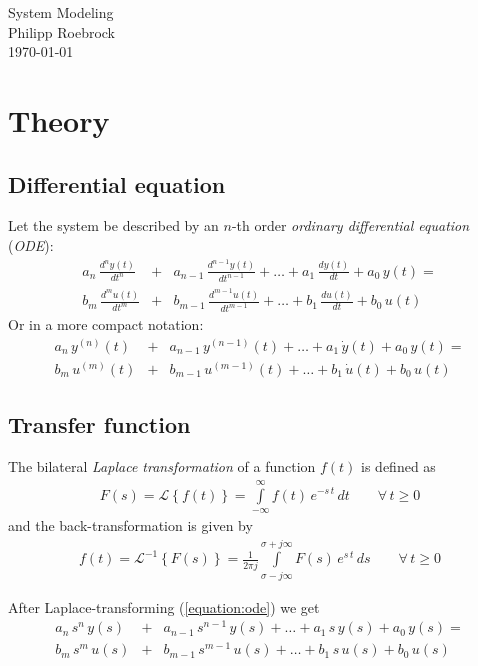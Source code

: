 \documentclass[a4paper,12pt]{article}
\newcommand{\Section}[2]{\section{#2}\label{section:#1}}
\newcommand{\SubSection}[2]{\subsection{#2}\label{subsection:#1}}
\newcommand{\ELabel}[1]{\label{equation:#1}}
\newcommand{\ERef}[1]{(\ref{equation:#1})}
\begin{document}
\vspace{1.5cm}
\begin{center}
{\Huge System Modeling}\\[3ex]
Philipp Roebrock\\[1ex]
\today\\
\end{center}
\vspace{1cm}






\Section{theory}{Theory}


\SubSection{diffeq}{Differential equation}

Let the system be described by an $n$-th order {\em ordinary differential equation} ({\em ODE}):
\begin{eqnarray}
a_{n}\,\frac{d^{n}y(t)}{dt^{n}}&+&a_{n-1}\,\frac{d^{n-1}y(t)}{dt^{n-1}}+\ldots+a_{1}\,\frac{dy(t)}{dt}+a_{0}\,y(t)=\nonumber\\
b_{m}\,\frac{d^{m}u(t)}{dt^{m}}&+&b_{m-1}\,\frac{d^{m-1}u(t)}{dt^{m-1}}+\ldots+b_{1}\,\frac{du(t)}{dt}+b_{0}\,u(t)
\end{eqnarray}
Or in a more compact notation:
\begin{eqnarray}
\ELabel{ode}
a_{n}\,y^{(n)}(t)&+&a_{n-1}\,y^{(n-1)}(t)+\ldots+a_{1}\,\dot{y}(t)+a_{0}\,y(t)=\nonumber\\
b_{m}\,u^{(m)}(t)&+&b_{m-1}\,u^{(m-1)}(t)+\ldots+b_{1}\,\dot{u}(t)+b_{0}\,u(t)
\end{eqnarray}

\SubSection{xferfunc}{Transfer function}

The bilateral {\em Laplace transformation} of a function $f(t)$ is defined as
\begin{eqnarray}
F(s)=\mathcal{L}\left\{f(t)\right\}=\int\limits_{-\infty}^{\infty}f(t)\,e^{-s\,t}\,dt\qquad\forall\,t\geq0
\end{eqnarray}
and the back-transformation is given by
\begin{eqnarray}
f(t)=\mathcal{L}^{-1}\left\{F(s)\right\}=\frac{1}{2\pi j}\int\limits_{\sigma-j\infty}^{\sigma+j\infty}F(s)\,e^{s\,t}\,ds\qquad\forall\,t\geq0
\end{eqnarray}

After Laplace-transforming \ERef{ode} we get
\begin{eqnarray}
\ELabel{xfer}
a_{n}\,s^{n}\,y(s)&+&a_{n-1}\,s^{n-1}\,y(s)+\ldots+a_{1}\,s\,y(s)+a_{0}\,y(s)=\nonumber\\
b_{m}\,s^{m}\,u(s)&+&b_{m-1}\,s^{m-1}\,u(s)+\ldots+b_{1}\,s\,u(s)+b_{0}\,u(s)
\end{eqnarray}
\end{document}
